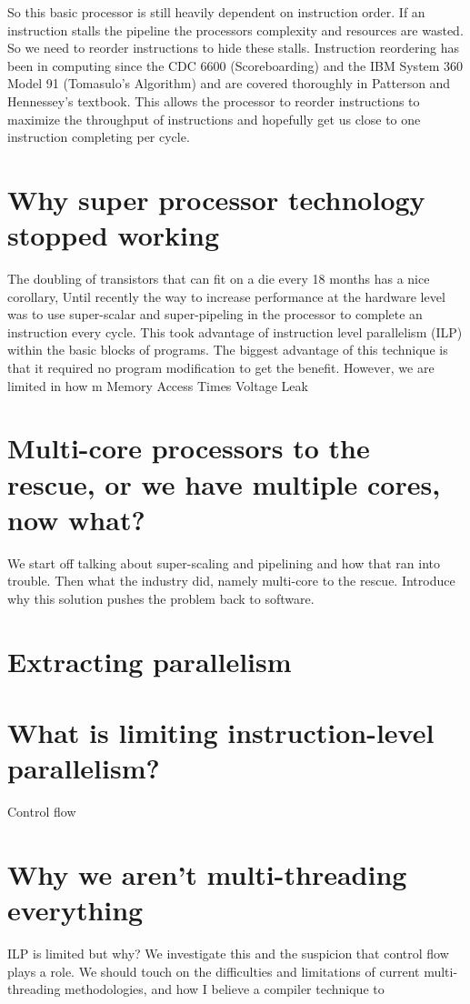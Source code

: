 \documentclass[12pt,twoside,letterpaper]{article}
\begin{document}
So this basic processor is still heavily dependent on instruction order. If an instruction stalls the pipeline the processors complexity and resources are wasted. So we need to reorder instructions to hide these stalls. Instruction reordering has been in computing since the CDC 6600 (Scoreboarding) and the IBM System 360 Model 91 (Tomasulo's Algorithm) and are covered thoroughly in Patterson and Hennessey's textbook. This allows the processor to reorder instructions to maximize the throughput of instructions and hopefully get us close to one instruction completing per cycle.

\section*{Why super processor technology stopped working}
The doubling of transistors that can fit on a die every 18 months has a nice corollary, 
Until recently the way to increase performance at the hardware level was to use super-scalar and super-pipeling in the processor to complete an instruction every cycle. This took advantage of instruction level parallelism (ILP) within the basic blocks of programs. The biggest advantage of this technique is that it required no program modification to get the benefit. However, we are limited in how m
Memory Access Times
Voltage Leak
\section*{Multi-core processors to the rescue, or we have multiple cores, now what?}

We start off talking about super-scaling and pipelining and how that ran into trouble. Then what the industry did, namely multi-core to the rescue. Introduce why this solution pushes the problem back to software.


\section*{Extracting parallelism}
\section*{What is limiting instruction-level parallelism?}
Control flow
\section*{Why we aren't multi-threading everything}

ILP is limited but why? We investigate this and the suspicion that control flow plays a role. We should touch on the difficulties and limitations of current multi-threading methodologies, and how I believe a compiler technique to 
\end{document}
